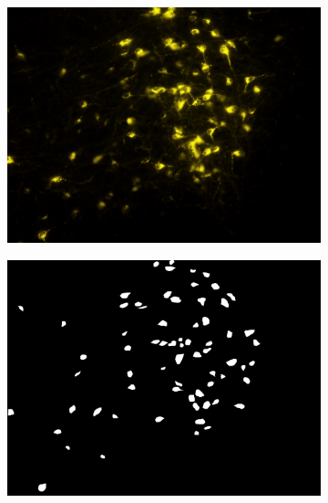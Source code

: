 \begin{figure}%
\centering
\begin{subfigure}{0.55\textwidth}
\includegraphics[width=\linewidth]{figures/120_dataset/i_clumping_yellow.png}
\subcaption{}
\end{subfigure}%
\begin{subfigure}{0.55\textwidth}
\includegraphics[width=\linewidth]{figures/120_dataset/m_clumping_yellow.png}
\subcaption{}
\label{fig:artifacts:clumping}
\end{subfigure}


\end{figure}
